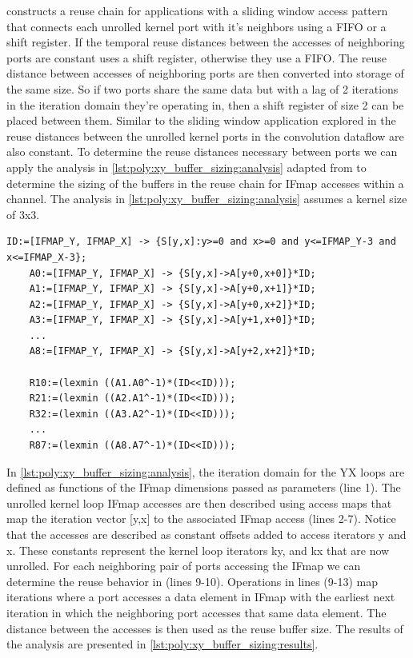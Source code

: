 \cite{meeus} constructs a reuse chain for applications with a sliding window
access pattern that connects each unrolled kernel port with it's neighbors using
a FIFO or a shift register. If the temporal reuse distances between the accesses
of neighboring ports are constant \cite{meeus} uses a shift register, otherwise
they use a FIFO. The reuse distance between accesses of neighboring ports are
then converted into storage of the same size. So if two ports share the same
data but with a lag of 2 iterations in the iteration domain they're operating
in, then a shift register of size 2 can be placed between them. Similar to the
sliding window application explored in \cite{meeus} the reuse distances between
the unrolled kernel ports in the convolution dataflow are also constant. To
determine the reuse distances necessary between ports we can apply the analysis
in \autoref{lst:poly:xy_buffer_sizing:analysis} adapted from \cite{meeus} to
determine the sizing of the buffers in the reuse chain for IFmap accesses within
a channel. The analysis in \autoref{lst:poly:xy_buffer_sizing:analysis} assumes
a kernel size of 3x3. 


\begin{lstlisting}[caption=Determining buffer sizes in 3x3 convolutions, label={lst:poly:xy_buffer_sizing:analysis}]
    ID:=[IFMAP_Y, IFMAP_X] -> {S[y,x]:y>=0 and x>=0 and y<=IFMAP_Y-3 and x<=IFMAP_X-3};
    A0:=[IFMAP_Y, IFMAP_X] -> {S[y,x]->A[y+0,x+0]}*ID;
    A1:=[IFMAP_Y, IFMAP_X] -> {S[y,x]->A[y+0,x+1]}*ID;
    A2:=[IFMAP_Y, IFMAP_X] -> {S[y,x]->A[y+0,x+2]}*ID;
    A3:=[IFMAP_Y, IFMAP_X] -> {S[y,x]->A[y+1,x+0]}*ID;
    ...
    A8:=[IFMAP_Y, IFMAP_X] -> {S[y,x]->A[y+2,x+2]}*ID;

    R10:=(lexmin ((A1.A0^-1)*(ID<<ID)));
    R21:=(lexmin ((A2.A1^-1)*(ID<<ID)));
    R32:=(lexmin ((A3.A2^-1)*(ID<<ID)));
    ...
    R87:=(lexmin ((A8.A7^-1)*(ID<<ID)));
\end{lstlisting}

In \autoref{lst:poly:xy_buffer_sizing:analysis}, the iteration domain for the YX
loops are defined as functions of the IFmap dimensions passed as parameters (line 1).
The unrolled kernel loop IFmap accesses are then described using access maps
that map the iteration vector [y,x] to the associated IFmap access (lines 2-7).
Notice that the accesses are described as constant offsets added to access iterators y
and x. These constants represent the kernel loop iterators ky, and kx that are now
unrolled. For each neighboring pair of ports accessing the IFmap we can
determine the reuse behavior in (lines 9-10). Operations in lines (9-13) map
iterations where a port accesses a data element in IFmap with the earliest next
iteration in which the neighboring port accesses that same data element. The
distance between the accesses is then used as the reuse buffer size. The results
of the analysis are presented in \autoref{lst:poly:xy_buffer_sizing:results}.

